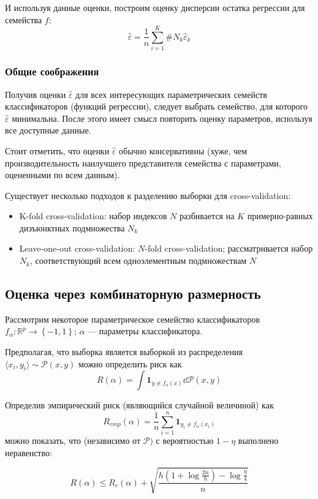 \documentclass[11pt, a4paper]{article}\usepackage[]{graphicx}\usepackage[]{color}
\begin{document}
И используя данные оценки, построим оценку дисперсии остатка регрессии для семейства $f$:
\[
    \hat{\varepsilon}=\frac{1}{n}\sum\limits_{i=1}^K \#N_k\hat{\varepsilon}_k
\]

\subsubsection{Общие соображения}
Получив оценки $\hat{\varepsilon}$ для всех интересующих параметрических семейств классификаторов (функций регрессии), следует выбрать
семейство, для которого $\hat{\varepsilon}$ минимальна. После этого имеет смысл повторить оценку параметров,
используя все доступные данные.

Стоит отметить, что оценки $\hat{\varepsilon}$ обычно консервативны (хуже, чем производительность наилучшего
представителя семейства с параметрами, оцененными по всем данным).

Существует несколько подходов к разделению выборки для cross-validation:
\begin{itemize}
    \item K-fold cross-validation: набор индексов $N$ разбивается на $K$ примерно-равных дизъюнктных подмножества $N_k$
    \item Leave-one-out cross-validation: $N$-fold cross-validation; рассматривается набор $N_k$, соответствующий всем
        одноэлементным подмножествам $N$
\end{itemize}


\subsection{Оценка через комбинаторную размерность}
Рассмотрим некоторое параметрическое семейство классификаторов $f_\alpha:\mathbb{R}^p\rightarrow\left\{-1,1\right\}$;
$\alpha$ --- параметры классификатора.

Предполагая, что выборка является выборкой из распределения $\langle x_i, y_i\rangle\sim\mathcal{P}\left(x,y\right)$
можно определить риск как
\[
R\left(\alpha\right)=\int\mathbf{1}_{y\neq f_\alpha\left(x\right)}\dd{\mathcal{P}\left(x, y\right)}
\]

Определив эмпирический риск (являющийся случайной величиной) как
\[
R_{emp}\left(\alpha\right)=\frac{1}{n}\sum\limits_{i=1}^n\mathbf{1}_{y_i\neq f_\alpha\left(x_i\right)}
\]
можно показать, что (независимо от $\mathcal{P})$ с вероятностью $1-\eta$ выполнено неравенство:

	$$	R\left(\alpha\right) \leq R_e\left(\alpha\right)+\sqrt{\frac{h\left(1+\log{\frac{2n}{h}}\right)-\log\frac{\eta}{4}}{n}}$$
\end{document}
